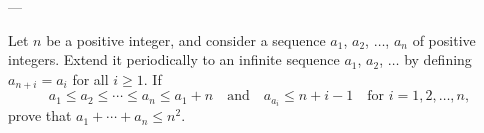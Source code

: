 
---

Let $n$ be a positive integer, and consider a sequence $a_1$, $a_2$, $\ldots$, $a_n$ of positive integers. Extend it periodically to an infinite sequence $a_1$, $a_2$, $\ldots$ by defining $a_{n+i}=a_i$ for all $i\ge1$. If \[a_1\le a_2\le\cdots\le a_n\le a_1+n\quad\text{and}\quad a_{a_i}\le n+i-1\quad\text{for }i=1,2,\ldots,n,\]
prove that $a_1+\cdots+a_n\le n^2$.
